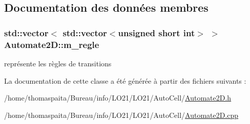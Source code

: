 \subsection{Documentation des données membres}
\subsubsection[{\texorpdfstring{m\+\_\+regle}{m_regle}}]{\setlength{\rightskip}{0pt plus 5cm}std\+::vector$<$ std\+::vector$<$unsigned short int$>$ $>$ Automate2\+D\+::m\+\_\+regle\hspace{0.3cm}{\ttfamily [protected]}}\hypertarget{class_automate2_d_ac894413963ffddd67dc899e64a41bca0}{}\label{class_automate2_d_ac894413963ffddd67dc899e64a41bca0}
représente les règles de transitions 

La documentation de cette classe a été générée à partir des fichiers suivants \+:\begin{DoxyCompactItemize}
\item 
/home/thomaspaita/\+Bureau/info/\+L\+O21/\+L\+O21/\+Auto\+Cell/\hyperlink{_automate2_d_8h}{Automate2\+D.\+h}\item 
/home/thomaspaita/\+Bureau/info/\+L\+O21/\+L\+O21/\+Auto\+Cell/\hyperlink{_automate2_d_8cpp}{Automate2\+D.\+cpp}\end{DoxyCompactItemize}
